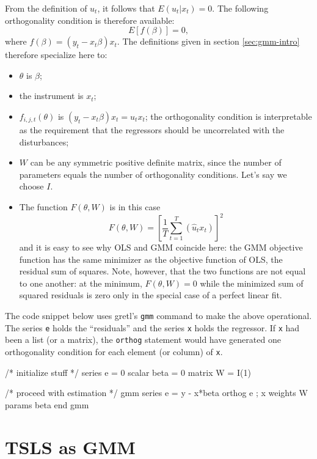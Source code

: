From the definition of $u_t$, it follows that $E(u_t|x_t) = 0$. 
The following orthogonality condition is therefore available:
\begin{equation}
  \label{eq:oc-ols}
  E \left[ f(\beta) \right] = 0 ,
\end{equation}
where $f(\beta) = (y_t - x_t \beta) x_t$. The definitions given in
section \ref{sec:gmm-intro} therefore specialize here to:
\begin{itemize}
\item $\theta$ is $\beta$;
\item the instrument is $x_t$;
\item $f_{i,j,t}(\theta)$ is $(y_t - x_t \beta) x_t = u_t
  x_t$; the orthogonality condition is interpretable as the
  requirement that the regressors should be uncorrelated with the
  disturbances;
\item $W$ can be any symmetric positive definite matrix, since
  the number of parameters equals the number of orthogonality
  conditions. Let's say we choose $I$.
\item The function $F(\theta, W)$ is in this case
  \[
    F(\theta, W) = \left[ \frac{1}{T} \sum_{t=1}^T (\hat{u}_t x_t) \right]^2
  \]
  and it is easy to see why OLS and GMM coincide here: the GMM
  objective function has the same minimizer as the objective function
  of OLS, the residual sum of squares. Note, however, that the two
  functions are not equal to one another: at the minimum, $F(\theta,
  W) = 0$ while the minimized sum of squared residuals is zero only in
  the special case of a perfect linear fit.
\end{itemize}

The code snippet below uses gretl's \texttt{gmm} command to make the
above operational.  The series \texttt{e} holds the ``residuals'' and
the series \texttt{x} holds the regressor.  If \texttt{x} had been a
list (or a matrix), the \texttt{orthog} statement would have generated
one orthogonality condition for each element (or column) of
\texttt{x}.
%
\begin{code}
/* initialize stuff */
series e = 0
scalar beta = 0
matrix W = I(1)

/* proceed with estimation */
gmm 
  series e = y - x*beta
  orthog e ; x
  weights W
  params beta
end gmm
\end{code}


\section{TSLS as GMM}
\label{sec:gmm-tsls}

